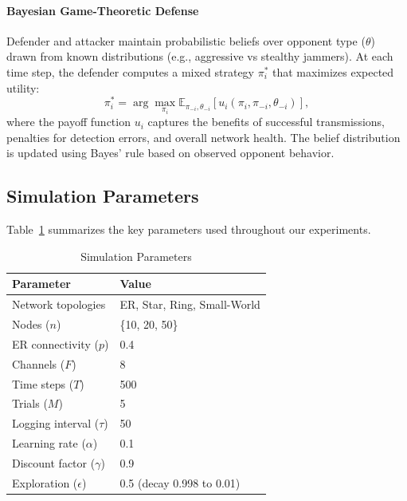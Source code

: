 \documentclass[conference]{IEEEtran}
\begin{document}
\paragraph{Bayesian Game-Theoretic Defense} Defender and attacker maintain probabilistic beliefs over opponent type ($\theta$) drawn from known distributions (e.g., aggressive vs stealthy jammers). At each time step, the defender computes a mixed strategy $\pi_i^*$ that maximizes expected utility:
\[
\pi_i^* = \arg\max_{\pi_i} \mathbb{E}_{\pi_{-i},\theta_{-i}}[u_i(\pi_i,\pi_{-i},\theta_{-i})],
\]
where the payoff function $u_i$ captures the benefits of successful transmissions, penalties for detection errors, and overall network health. The belief distribution is updated using Bayes' rule based on observed opponent behavior.

\subsection{Simulation Parameters}
Table~\ref{tab:params} summarizes the key parameters used throughout our experiments.

\begin{table}[h]
\centering
\caption{Simulation Parameters}
\label{tab:params}
\begin{tabular}{@{}ll@{}}
\toprule
Parameter                    & Value                          \\ \midrule
Network topologies           & ER, Star, Ring, Small-World    \\
Nodes ($n$)                  & \{10, 20, 50\}                 \\
ER connectivity ($p$)        & 0.4                            \\
Channels ($F$)               & 8                              \\
Time steps ($T$)             & 500                            \\
Trials ($M$)                 & 5                              \\
Logging interval ($\tau$)    & 50                             \\
Learning rate ($\alpha$)     & 0.1                            \\
Discount factor ($\gamma$)   & 0.9                            \\
Exploration ($\epsilon$)     & 0.5 (decay 0.998 to 0.01)      \\
\bottomrule
\end{tabular}
\end{table}
\end{document}
